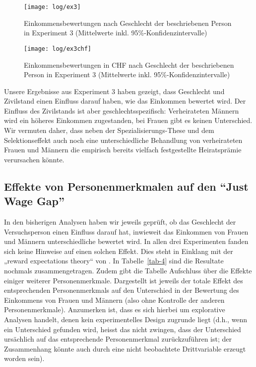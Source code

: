 \documentclass[a4paper,12pt]{article}
\renewcommand{\baselinestretch}{1.1}
\newif\ifcomments
\newcommand{\comment}[1]{%
    \ifcomments\marginpar{\renewcommand{\baselinestretch}{1}\tiny\hspace*{-1.1em}\colorbox{gray!20}%
    {\textcolor{red}{\parbox[t]{.9in}{\raggedright #1}}}}\fi}
\begin{document}
\begin{figure}[p]\centering
    \texttt{[image: log/ex3]}
    \caption{Einkommensbewertungen nach Geschlecht der beschriebenen Person in 
    Experiment 3 (Mittelwerte inkl. 95\%-Konfidenzintervalle)}\label{fig-ex3}
\end{figure}

\begin{figure}[p]\centering
    \texttt{[image: log/ex3chf]}
    \caption{Einkommensbewertungen in CHF nach Geschlecht der beschriebenen Person in 
    Experiment 3 (Mittelwerte inkl. 95\%-Konfidenzintervalle)}\label{fig-ex3chf}
\end{figure}

\comment{2 Abschnitte zu Heiratsbonus nach oben verschoben.}

Unsere Ergebnisse aus Experiment 3 haben gezeigt, dass Geschlecht und
Zivilstand einen Einfluss darauf haben, wie das Einkommen bewertet wird. Der
Einfluss des Zivilstands ist aber geschlechtsspezifisch: Verheirateten Männern
wird ein höheres Einkommen zugestanden, bei Frauen gibt es keinen Unterschied.
Wir vermuten daher, dass neben der Spezialisierungs-These und dem
Selektionseffekt auch noch eine unterschiedliche Behandlung von verheirateten
Frauen und Männern die empirisch bereits vielfach festgestellte Heiratsprämie
verursachen könnte.

\subsection{Effekte von Personenmerkmalen auf den “Just Wage Gap”}

In den bisherigen Analysen haben wir jeweils geprüft, ob das Geschlecht der
Versuchsperson einen Einfluss darauf hat, inwieweit das Einkommen von Frauen
und Männern unterschiedliche bewertet wird. In allen drei Experimenten fanden
sich keine Hinweise auf einen solchen Effekt. Dies steht in Einklang mit der
„reward expectations theory“ von \citet{Auspurg-etal-2017}. In
Tabelle~\ref{tab-4} sind die Resultate nochmals zusammengetragen. Zudem gibt
die Tabelle Aufschluss über die Effekte einiger weiterer Personenmerkmale.
Dargestellt ist jeweils der totale Effekt des entsprechenden Personenmerkmals
auf den Unterschied in der Bewertung des Einkommens von Frauen und Männern
(also ohne Kontrolle der anderen Personenmerkmale). Anzumerken ist, dass es
sich hierbei um explorative Analysen handelt, denen kein experimentelles Design
zugrunde liegt (d.h., wenn ein Unterschied gefunden wird, heisst das nicht
zwingen, dass der Unterschied ursächlich auf das entsprechende Personenmerkmal
zurückzuführen ist; der Zusammenhang könnte auch durch eine nicht beobachtete
Drittvariable erzeugt worden sein).
\end{document}
